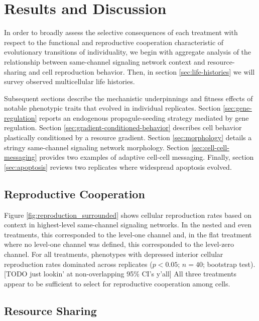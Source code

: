 \section{Results and Discussion}

In order to broadly assess the selective consequences of each treatment with respect to the functional and reproductive cooperation characteristic of evolutionary transitions of individuality, we begin with aggregate analysis of the relationship between same-channel signaling network context and resource-sharing and cell reproduction behavior.
Then, in section \ref{sec:life-histories} we will survey observed multicellular life histories.

Subsequent sections describe the mechanistic underpinnings and fitness effects of notable phenotypic traits that evolved in individual replicates.
Section \ref{sec:gene-regulation} reports an endogenous propagule-seeding strategy mediated by gene regulation.
Section \ref{sec:gradient-conditioned-behavior} describes cell behavior plastically conditioned by a resource gradient.
Section \ref{sec:morphology} details a stringy same-channel signaling network morphology.
Section \ref{sec:cell-cell-messaging} provides two examples of adaptive cell-cell messaging.
Finally, section \ref{sec:apoptosis} reviews two replicates where widespread apoptosis evolved.

\subsection{Reproductive Cooperation} \label{sec:reproductive-cooperation}



Figure \ref{fig:reproduction_surrounded} shows cellular reproduction rates based on context in highest-level same-channel signaling networks.
In the nested and even treatments, this corresponded to the level-one channel and, in the flat treatment where no level-one channel was defined, this corresponded to the level-zero channel.
For all treatments, phenotypes with depressed interior cellular reproduction rates dominated across replicates ($p < 0.05$; $n=40$; bootstrap test).
[TODO just lookin' at non-overlapping 95\% CI's y'all]
All three treatments appear to be sufficient to select for reproductive cooperation among cells.

\subsection{Resource Sharing} \label{sec:resource-sharing}

